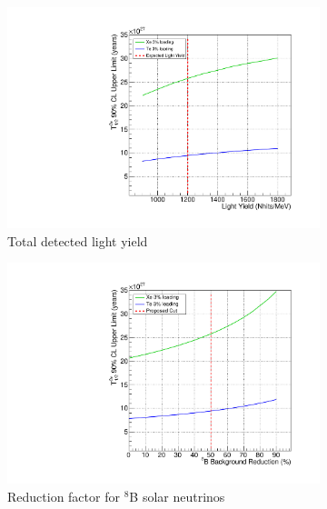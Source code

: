 \begin{figure}
\centering
\begin{subfigure}[b]{0.49\textwidth}
 \includegraphics[width=\textwidth]{dbd/ly_LT_cut.pdf}
 \caption{Total detected light yield}
 \label{fig:scale-ly}
\end{subfigure}
\begin{subfigure}[b]{0.49\textwidth}
 \includegraphics[width=\textwidth]{dbd/b8_reduction_LT_cut.pdf}
 \caption{Reduction factor for $^8$B solar neutrinos}
 \label{fig:scale-b8}
\end{subfigure}\\
\begin{subfigure}[b]{0.49\textwidth}

\end{subfigure}
\end{figure}

